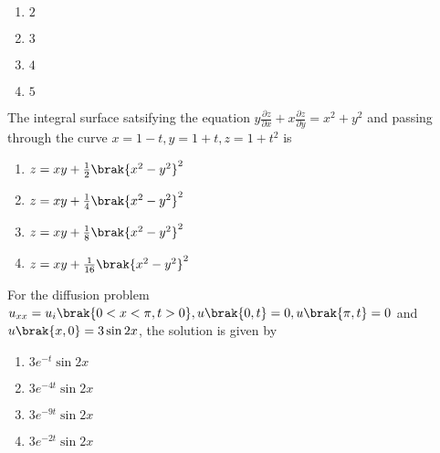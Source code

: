	\begin{enumerate}
		\item $2$
		\item $3$
		\item $4$
		\item $5$
	\end{enumerate}


    \item The integral surface satsifying the equation $y\frac{\partial{z}}{\partial{x}} + x\frac{\partial{z}}{\partial{y}} = x^2 + y^2$ and passing through the curve $x = 1 - t, y = 1 + t, z = 1 + t^2$ is
	\hfill{}

	\begin{enumerate}
		\item $z = xy + \frac{1}{2}\brak{x^2 - y^2}^2$
		\item $z = xy + \frac{1}{4}\brak{x^2 - y^2}^2$
		\item $z = xy + \frac{1}{8}\brak{x^2 - y^2}^2$
		\item $z = xy + \frac{1}{16}\brak{x^2 - y^2}^2$
	\end{enumerate}


    \item For the diffusion problem $u_{xx} = u_{i} \brak{0 < x < \pi, t > 0}, u\brak{0, t} = 0, u\brak{\pi, t} = 0$ and $u\brak{x, 0} = 3\sin{2x}$, the solution is given by
	\hfill{}

	\begin{enumerate}
		\item $3e^{-t}\sin{2x}$
		\item $3e^{-4t}\sin{2x}$
		\item $3e^{-9t}\sin{2x}$
		\item $3e^{-2t}\sin{2x}$
	\end{enumerate}